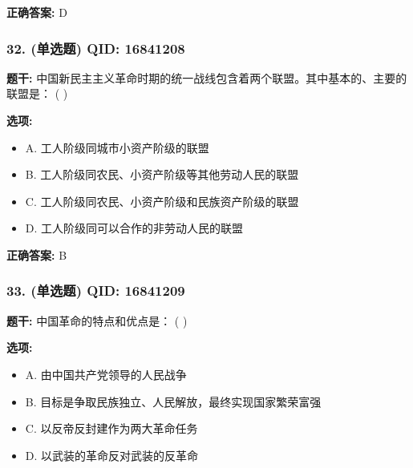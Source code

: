 \documentclass[12pt,UTF8]{ctexart}
\begin{document}
\textbf{正确答案:}
D

\vspace{0.3em}\hrulefill\vspace{0.7em}

\subsubsection*{32. (单选题) \small QID: 16841208}

\textbf{题干:}
中国新民主主义革命时期的统一战线包含着两个联盟。其中基本的、主要的联盟是： ( )

\textbf{选项:}
\begin{itemize}[leftmargin=*]

  \item A. 工人阶级同城市小资产阶级的联盟

  \item B. 工人阶级同农民、小资产阶级等其他劳动人民的联盟

  \item C. 工人阶级同农民、小资产阶级和民族资产阶级的联盟

  \item D. 工人阶级同可以合作的非劳动人民的联盟

\end{itemize}

\textbf{正确答案:}
B

\vspace{0.3em}\hrulefill\vspace{0.7em}

\subsubsection*{33. (单选题) \small QID: 16841209}

\textbf{题干:}
中国革命的特点和优点是： ( )

\textbf{选项:}
\begin{itemize}[leftmargin=*]

  \item A. 由中国共产党领导的人民战争

  \item B. 目标是争取民族独立、人民解放，最终实现国家繁荣富强

  \item C. 以反帝反封建作为两大革命任务

  \item D. 以武装的革命反对武装的反革命

\end{itemize}
\end{document}
